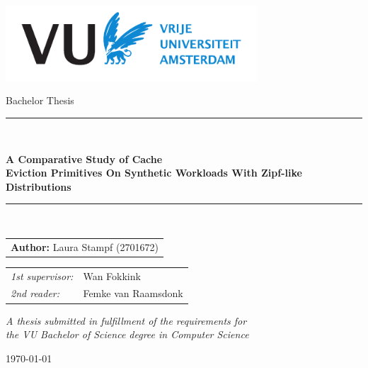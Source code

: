 \documentclass[a4paper, 10pt]{report}
\renewcommand{\chaptername}{} %
\begin{document}
\thispagestyle{empty}

\begin{center}
\vspace{1mm}
\includegraphics[height=28mm]{resources/logo-vua.pdf}
\vspace{1cm}

{\Large Bachelor Thesis}
\vspace{1cm}

\rule{.9\linewidth}{.6pt}\\
\vspace{0.4cm}
{\huge \bfseries A Comparative Study of Cache \\ Eviction Primitives On Synthetic Workloads With Zipf-like \\ Distributions \par}
\vspace{0.4cm}
\rule{.9\linewidth}{.6pt}\\[1.5cm]
\vspace*{2mm}
{\Large

\begin{tabular}{l}
{\bf Author:} Laura Stampf (2701672)
\end{tabular}
}

\vspace*{1.5cm}

\begin{tabular}{ll}
{\it 1st supervisor:} & Wan Fokkink \\
{\it 2nd reader:} & Femke van Raamsdonk  \\
\end{tabular}

\vspace*{2cm}
\textit{A thesis submitted in fulfillment of the requirements for\\ the VU Bachelor
of Science degree in Computer Science }
\vspace*{1cm}

\today %
\end{center}

\pagestyle{fancy}
\fancyhead{} %
\fancyhead[R]{ \leftmark}

\newpage
\tableofcontents
{}









\printbibliography
\end{document}
